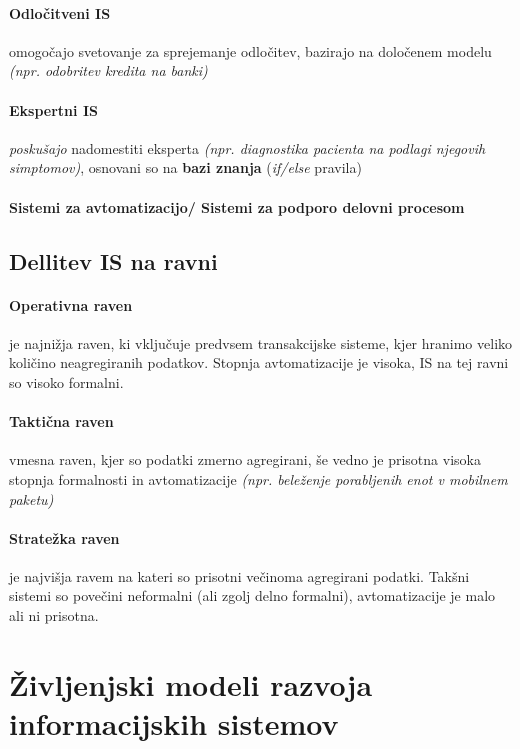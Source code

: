 \documentclass[a4paper,12pt]{report}
\begin{document}
   \paragraph{Odločitveni IS} omogočajo svetovanje za sprejemanje odločitev, bazirajo na določenem modelu \textit{(npr. odobritev kredita na banki)}

   \paragraph{Ekspertni IS} \textit{poskušajo} nadomestiti eksperta \textit{(npr. diagnostika pacienta na podlagi njegovih simptomov)}, osnovani so na \textbf{bazi znanja} (\textit{if/else} pravila)

   \paragraph{Sistemi za avtomatizacijo/ Sistemi za podporo delovni procesom}\mbox{}

   \subsection{Dellitev IS na ravni}
      \paragraph{Operativna raven} je najnižja raven, ki vključuje predvsem transakcijske sisteme, kjer hranimo veliko količino neagregiranih podatkov.
      Stopnja avtomatizacije je visoka, IS na tej ravni so visoko formalni.
      \paragraph{Taktična raven} vmesna raven, kjer so podatki zmerno agregirani, še vedno je prisotna visoka stopnja formalnosti in avtomatizacije \textit{(npr. beleženje porabljenih enot v mobilnem paketu)}
      \paragraph{Stratežka raven} je najvišja ravem na kateri so prisotni večinoma agregirani podatki. Takšni sistemi so povečini neformalni (ali zgolj delno formalni), avtomatizacije je malo ali ni prisotna.

   \section{Življenjski modeli razvoja informacijskih sistemov}
\end{document}
